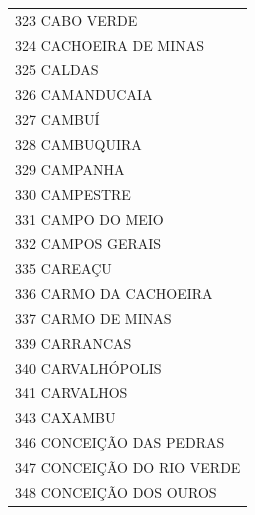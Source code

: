\documentclass{article}
\begin{document}
\begin{longtable}[c]{m{18cm}}
\multicolumn{1}{l}{ \hspace{2em} 323 CABO VERDE } \\
\multicolumn{1}{l}{ \hspace{2em} 324 CACHOEIRA DE MINAS } \\
\multicolumn{1}{l}{ \hspace{2em} 325 CALDAS } \\
\multicolumn{1}{l}{ \hspace{2em} 326 CAMANDUCAIA } \\
\multicolumn{1}{l}{ \hspace{2em} 327 CAMBUÍ } \\
\multicolumn{1}{l}{ \hspace{2em} 328 CAMBUQUIRA } \\
\multicolumn{1}{l}{ \hspace{2em} 329 CAMPANHA } \\
\multicolumn{1}{l}{ \hspace{2em} 330 CAMPESTRE } \\
\multicolumn{1}{l}{ \hspace{2em} 331 CAMPO DO MEIO } \\
\multicolumn{1}{l}{ \hspace{2em} 332 CAMPOS GERAIS } \\
\multicolumn{1}{l}{ \hspace{2em} 335 CAREAÇU } \\
\multicolumn{1}{l}{ \hspace{2em} 336 CARMO DA CACHOEIRA } \\
\multicolumn{1}{l}{ \hspace{2em} 337 CARMO DE MINAS } \\
\multicolumn{1}{l}{ \hspace{2em} 339 CARRANCAS } \\
\multicolumn{1}{l}{ \hspace{2em} 340 CARVALHÓPOLIS } \\
\multicolumn{1}{l}{ \hspace{2em} 341 CARVALHOS } \\
\multicolumn{1}{l}{ \hspace{2em} 343 CAXAMBU } \\
\multicolumn{1}{l}{ \hspace{2em} 346 CONCEIÇÃO DAS PEDRAS } \\
\multicolumn{1}{l}{ \hspace{2em} 347 CONCEIÇÃO DO RIO VERDE } \\
\multicolumn{1}{l}{ \hspace{2em} 348 CONCEIÇÃO DOS OUROS } \\

\end{longtable}
\end{document}
